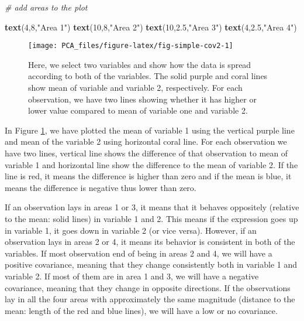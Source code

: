 \documentclass[
]{book}
\newenvironment{Shaded}{\begin{snugshade}}{\end{snugshade}}
\newcommand{\CommentTok}[1]{\textcolor[rgb]{0.56,0.35,0.01}{\textit{#1}}}
\newcommand{\DecValTok}[1]{\textcolor[rgb]{0.00,0.00,0.81}{#1}}
\newcommand{\FloatTok}[1]{\textcolor[rgb]{0.00,0.00,0.81}{#1}}
\newcommand{\KeywordTok}[1]{\textcolor[rgb]{0.13,0.29,0.53}{\textbf{#1}}}
\newcommand{\NormalTok}[1]{#1}
\newcommand{\StringTok}[1]{\textcolor[rgb]{0.31,0.60,0.02}{#1}}
\theoremstyle{definition}
\theoremstyle{definition}
\theoremstyle{definition}
\theoremstyle{remark}
\begin{document}
\begin{Shaded}
\begin{Highlighting}[]
\CommentTok{# add areas to the plot}

\KeywordTok{text}\NormalTok{(}\DecValTok{4}\NormalTok{,}\DecValTok{8}\NormalTok{,}\StringTok{"Area 1"}\NormalTok{)}
\KeywordTok{text}\NormalTok{(}\DecValTok{10}\NormalTok{,}\DecValTok{8}\NormalTok{,}\StringTok{"Area 2"}\NormalTok{)}
\KeywordTok{text}\NormalTok{(}\DecValTok{10}\NormalTok{,}\FloatTok{2.5}\NormalTok{,}\StringTok{"Area 3"}\NormalTok{)}
\KeywordTok{text}\NormalTok{(}\DecValTok{4}\NormalTok{,}\FloatTok{2.5}\NormalTok{,}\StringTok{"Area 4"}\NormalTok{)}
\end{Highlighting}
\end{Shaded}

\begin{figure}

{\centering \texttt{[image: PCA\_files/figure-latex/fig-simple-cov2-1]} 

}

\caption{Here, we select two variables and show how the data is spread according to both of the variables. The solid purple and coral lines show mean of variable and variable 2, respectively. For each observation, we have two lines showing whether it has higher or lower value compared to mean of variable one and variable 2.}\label{fig:fig-simple-cov2}
\end{figure}

In Figure \ref{fig:fig-simple-cov2}, we have plotted the mean of variable 1 using the vertical purple line and mean of the variable 2 using horizontal coral line. For each observation we have two lines, vertical line shows the difference of that observation to mean of variable 1 and horizontal line show the difference to the mean of variable 2. If the line is red, it means the difference is higher than zero and if the mean is blue, it means the difference is negative thus lower than zero.

If an observation lays in areas 1 or 3, it means that it behaves oppositely (relative to the mean: solid lines) in variable 1 and 2. This means if the expression goes up in variable 1, it goes down in variable 2 (or vice versa). However, if an observation lays in areas 2 or 4, it means its behavior is consistent in both of the variables. If most observation end of being in areas 2 and 4, we will have a positive covariance, meaning that they change consistently both in variable 1 and variable 2. If most of them are in area 1 and 3, we will have a negative covariance, meaning that they change in opposite directions. If the observations lay in all the four areas with approximately the same magnitude (distance to the mean: length of the red and blue lines), we will have a low or no covariance.
\end{document}
